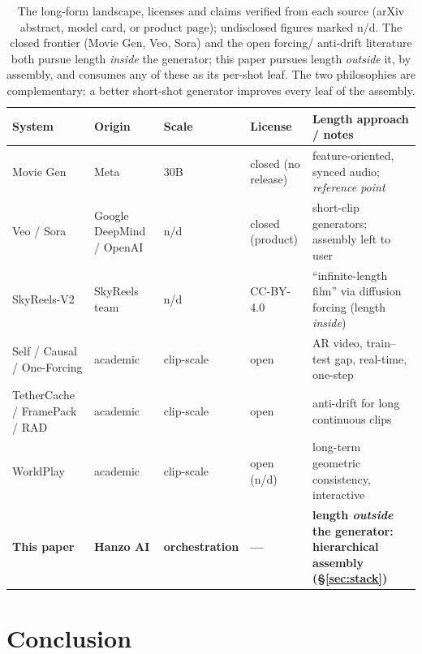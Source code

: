 \documentclass[11pt]{article}
\begin{document}
\begin{table}[t]
\centering
\small
\setlength{\tabcolsep}{4.5pt}
\begin{tabular}{@{}p{2.9cm}p{2.5cm}p{1.9cm}p{2.0cm}p{3.4cm}@{}}
\toprule
\textbf{System} & \textbf{Origin} & \textbf{Scale} & \textbf{License} & \textbf{Length approach / notes} \\
\midrule
Movie Gen & Meta & 30B & closed (no release) & feature-oriented, synced audio; \emph{reference point}~\cite{moviegen} \\
Veo / Sora & Google DeepMind / OpenAI & n/d & closed (product) & short-clip generators; assembly left to user~\cite{sora} \\
SkyReels-V2 & SkyReels team & n/d & CC-BY-4.0 & ``infinite-length film'' via diffusion forcing (length \emph{inside})~\cite{skyreels2} \\
Self / Causal / One-Forcing & academic~\cite{selfforcing,causalforcing,oneforcing} & clip-scale & open & AR video, train--test gap, real-time, one-step \\
TetherCache / FramePack / RAD & academic~\cite{tethercache,framepack,rad} & clip-scale & open & anti-drift for long continuous clips \\
WorldPlay & academic~\cite{worldplay} & clip-scale & open (n/d) & long-term geometric consistency, interactive \\
\textbf{This paper} & \textbf{Hanzo AI} & \textbf{orchestration} & \textbf{---} & \textbf{length \emph{outside} the generator: hierarchical assembly (\S\ref{sec:stack})} \\
\bottomrule
\end{tabular}
\caption{The long-form landscape, licenses and claims verified from each source (arXiv abstract, model card, or
product page); undisclosed figures marked n/d. The closed frontier (Movie Gen, Veo, Sora) and the open forcing/
anti-drift literature both pursue length \emph{inside} the generator; this paper pursues length \emph{outside}
it, by assembly, and consumes any of these as its per-shot leaf. The two philosophies are complementary: a
better short-shot generator improves every leaf of the assembly.}
\label{tab:landscape}
\end{table}

\section{Conclusion}
\label{sec:conclusion}
\end{document}
